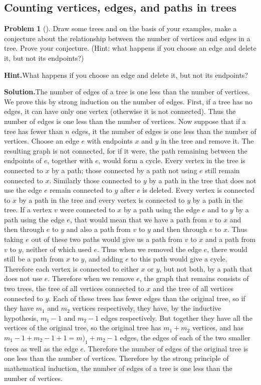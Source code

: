 \documentclass[10pt,]{book}
\theoremstyle{plain}
\theoremstyle{definition}
\newtheorem{activity}[project]{Problem}
\theoremstyle{definition}
\numberwithin{equation}{chapter}
\begin{document}
\subsection[{Counting vertices, edges, and paths in trees}]{Counting vertices, edges, and paths in trees}\label{subsection-17}
\begin{activity}[]\label{Noverticesandedgesoftree}
Draw some trees and on the basis of your examples, make a conjecture about the relationship between the number of vertices and edges in a tree. Prove your conjecture. (Hint: what happens if you choose an edge and delete it, but not its endpoints?)%
\par\medskip\noindent%
\textbf{Hint.}\quad What happens if you choose an edge and delete it, but not its endpoints?%
\par\medskip\noindent%
\textbf{Solution.}\quad The number of edges of a tree is one less than the number of vertices. We prove this by strong induction on the number of edges. First, if a tree has no edges, it can have only one vertex (otherwise it is not connected). Thus the number of edges is one less than the number of vertices. Now suppose that if a tree has fewer than \(n\) edges, it the number of edges is one less than the number of vertices. Choose an edge \(e\) with endpoints \(x\) and \(y\) in the tree and remove it. The resulting graph is not connected, for if it were, the path remaining between the endpoints of \(e\), together with \(e\), would form a cycle. Every vertex in the tree is connected to \(x\) by a path; those connected by a path not using \(e\) still remain connected to \(x\). Similarly those connected to \(y\) by a path in the tree that does not use the edge \(e\) remain connected to \(y\) after \(e\) is deleted. Every vertex is connected to \(x\) by a path in the tree and every vertex is connected to \(y\) by a path in the tree. If a vertex \(v\) were connected to \(x\) by a path using the edge \(e\) and to \(y\) by a path using the edge \(e\), that would mean that we have a path from \(v\) to \(x\) and then through \(e\) to \(y\) and also a path from \(v\) to \(y\) and then through \(e\) to \(x\). Thus taking \(e\) out of these two paths would give us a path from \(v\) to \(x\) and a path from \(v\) to \(y\), neither of which used \(e\). Thus when we removed the edge \(e\), there would still be a path from \(x\) to \(y\), and adding \(e\) to this path would give a cycle. Therefore each vertex is connected to either \(x\) or \(y\), but not both, by a path that does not use \(e\). Therefore when we remove \(e\), the graph that remains consists of two trees, the tree of all vertices connected to \(x\) and the tree of all vertices connected to \(y\). Each of these trees has fewer edges than the original tree, so if they have \(m_1\) and \(m_2\) vertices respectively, they have, by the inductive hypothesis, \(m_1-1\) and \(m_2-1\) edges respectively. But together they have all the vertices of the original tree, so the original tree has \(m_1+m_2\) vertices, and has \(m_1-1+m_2-1 +1=m)_1+m_2-1\) edges, the edges of each of the two smaller trees as well as the edge \(e\). Therefore the number of edges of the original tree is one less than the number of vertices. Therefore by the strong principle of mathematical induction, the number of edges of a tree is one less than the number of vertices.%

\end{activity}
\end{document}
